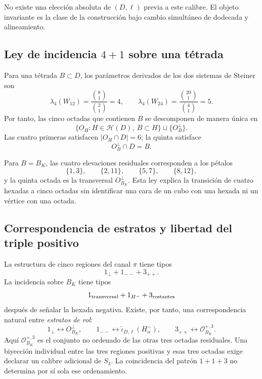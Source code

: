 No existe una elección absoluta de \((D,\ell)\) previa a este calibre. El
objeto invariante es la clase de la construcción bajo cambio simultáneo de
dodecada y alineamiento.

\subsection{Ley de incidencia \texorpdfstring{\(4+1\)}{4+1} sobre una tétrada}

Para una tétrada \(B\subset D\), los parámetros derivados de los dos
sistemas de Steiner son
\begin{equation}
 \lambda_4(W_{12})
 =\frac{\binom81}{\binom21}=4,
 \qquad
 \lambda_4(W_{24})
 =\frac{\binom{20}1}{\binom41}=5.
 \label{p12-83-c20-s3:eq:ley-cuatro-mas-uno-witt}
\end{equation}
Por tanto, las cinco octadas que contienen \(B\) se descomponen de manera
única en
\begin{equation}
 \{O_H:H\in\mathcal H(D),\ B\subset H\}
 \sqcup\{O_B^\perp\}.
 \label{p12-83-c20-s3:eq:descomposicion-cinco-octadas}
\end{equation}
Las cuatro primeras satisfacen \(|O_H\cap D|=6\); la quinta satisface
\begin{equation}
 O_B^\perp\cap D=B.
 \label{p12-83-c20-s3:eq:octada-transversal-tetrada}
\end{equation}

Para \(B=B_K\), las cuatro elevaciones residuales corresponden a los
pétalos
\[
 \{1,3\},
 \qquad
 \{2,11\},
 \qquad
 \{5,7\},
 \qquad
 \{8,12\},
\]
y la quinta octada es la transversal \(O_{B_K}^\perp\). Esta ley explica
la transición de cuatro hexadas a cinco octadas sin identificar una cara
de un cubo con una hexada ni un vértice con una octada.

\subsection{Correspondencia de estratos y libertad del triple positivo}

La estructura de cinco regiones del canal \(\pi\) tiene tipos
\[
 1_\perp+1_{--}+3_{++}.
\]
La incidencia sobre \(B_K\) tiene tipos
\[
 1_{\rm transversal}+1_{H^-}+3_{\rm restantes}
\]
después de señalar la hexada negativa. Existe, por tanto, una
correspondencia natural entre \emph{estratos de rol}:
\begin{equation}
 1_\perp\longleftrightarrow O_{B_K}^\perp,
 \qquad
 1_{--}\longleftrightarrow
 \widehat\iota_{D,\ell}(H_\alpha^-),
 \qquad
 3_{++}\longleftrightarrow
 \mathcal O_{B_K}^{+,3}.
 \label{p12-83-c20-s3:eq:correspondencia-estratos-cinco-cinco}
\end{equation}
Aquí \(\mathcal O_{B_K}^{+,3}\) es el conjunto no ordenado de las otras
tres octadas residuales. Una biyección individual entre las tres regiones
positivas y esas tres octadas exige declarar un calibre adicional de
\(S_3\). La coincidencia del patrón \(1+1+3\) no determina por sí sola ese
ordenamiento.


